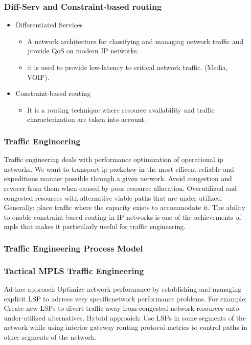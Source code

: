 \documentclass[12pt]{beamer}
\begin{document}
\begin{frame}
	\frametitle{Diff-Serv and Constraint-based routing}
		\begin{itemize}
			\item Differentiated Services
				\begin{itemize}
					\item A network architecture for classifying and managing network traffic and provide QoS on modern IP networks.
					\item it is used to provide low-latency to critical network traffic. (Media, VOIP).
				\end{itemize}
			\item Constraint-based routing
				\begin{itemize}
					\item It is a routing technique where resource availability and traffic characterization are taken into account.
				\end{itemize}
		\end{itemize}

\end{frame}






\begin{frame}
\frametitle{Traffic Engineering}
	Traffic engineering deals with performance optimization of operational ip networks. We want to transport ip packetsw in the most efficent reliable and expeditious manner possible through a given network.
    Avoid congestion and revocer from them when caused by poor resource allocation.
Overutilized and congested resources with alternative viable paths that are under utilized.
Generally: place traffic where the capacity exists to accommodate it.
The ability to enable constraint-based routing in IP networks is one of the achievements of mpls that makes it particularly useful for traffic engineering.
\end{frame}

\begin{frame}
\frametitle{Traffic Engineering Process Model}
\end{frame}

\begin{frame}
\frametitle{Tactical MPLS Traffic Engineering}
    Ad-hoc approach
    Optimize network performance by establishing and managing explicit LSP to adrress very specificnetwork performance problems.
    For example: Create new LSPs to divert traffic away from congested network resources onto under-utilized alternatives.
    Hybrid approaich: Use LSPs in some segments of the network while using interior gateway routing protocol metrics to control paths in other segments of the network.
\end{frame}
\end{document}
